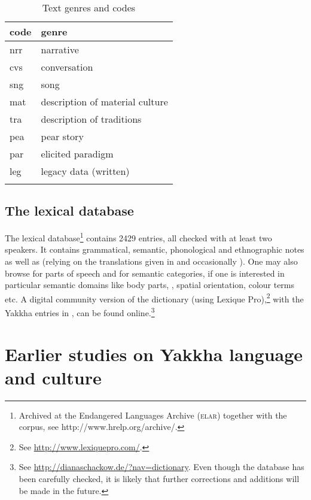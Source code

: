 \begin{table}[t]
\begin{center}
\begin{tabular}{ll}
\lsptoprule
{\sc code}&{\sc genre}\\
\midrule
nrr & narrative \\
cvs & conversation \\
sng & song\\
mat & description of material culture\\
tra & description of traditions\\
pea & pear story\\
par & elicited paradigm\\
leg & legacy data (written)\\
\lspbottomrule
\end{tabular}
\caption{Text genres and codes}\label{tab-genre}
\end{center}
\end{table}


\subsection{The lexical database}
The lexical database\footnote{Archived at the Endangered Languages Archive (\textsc{elar}) together with the corpus, see http://www.hrelp.org/archive/.} contains 2429 entries, all checked with at least two speakers. It contains grammatical, semantic, phonological and ethnographic notes as well as  (relying on the  translations given in \citet{Manandhar2002_Plants} and occasionally \citealt{Turner1931A-Comparative}). One may also browse for parts of speech and for semantic categories, if one is interested in particular semantic domains like body parts, , spatial orientation, colour terms etc. A digital community version of the dictionary (using Lexique Pro),\footnote{See \url{http://www.lexiquepro.com/}.} with the Yakkha entries in , can be found online.\footnote{See \url{http://dianaschackow.de/?nav=dictionary}. Even though the database has been carefully checked, it is likely that further corrections and additions will be made in the future.}


\section{Earlier studies on Yakkha language and culture}\label{earlier-work}


